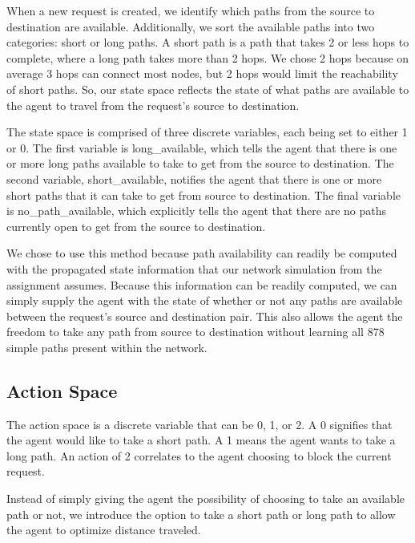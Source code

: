 \documentclass[conference]{IEEEtran}
\begin{document}
\begin{flushleft}
When a new request is created, we identify which paths from the source to destination are available. Additionally, we sort the available paths into two categories: short or long paths. A short path is a path that takes 2 or less hops to complete, where a long path takes more than 2 hops. We chose 2 hops because on average 3 hops can connect most nodes, but 2 hops would limit the reachability of short paths. So, our state space reflects the state of what paths are available to the agent to travel from the request's source to destination.
\end{flushleft}

\begin{flushleft}
The state space is comprised of three discrete variables, each being set to either 1 or 0. The first variable is long\_available, which tells the agent that there is one or more long paths available to take to get from the source to destination. The second variable, short\_available, notifies the agent that there is one or more short paths that it can take to get from source to destination. The final variable is no\_path\_available, which explicitly tells the agent that there are no paths currently open to get from the source to destination.
\end{flushleft}

\begin{flushleft}
We chose to use this method because path availability can readily be computed with the propagated state information that our network simulation from the assignment assumes. Because this information can be readily computed, we can simply supply the agent with the state of whether or not any paths are available between the request's source and destination pair. This also allows the agent the freedom to take any path from source to destination without learning all 878 simple paths present within the network.
\end{flushleft}


\subsection{Action Space}
\begin{flushleft}
The action space is a discrete variable that can be 0, 1, or 2. A 0 signifies that the agent would like to take a short path. A 1 means the agent wants to take a long path. An action of 2 correlates to the agent choosing to block the current request. 
\end{flushleft}
\begin{flushleft}
Instead of simply giving the agent the possibility of choosing to take an available path or not, we introduce the option to take a short path or long path to allow the agent to optimize distance traveled. 
\end{flushleft}
\end{document}
